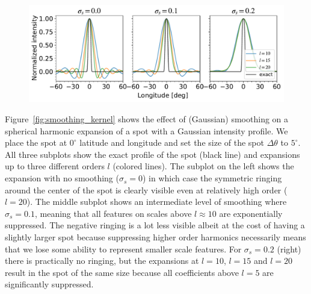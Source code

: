 \documentclass[modern]{aastex62}
\begin{document}
\begin{figure}[t!]
    \begin{centering}
    \includegraphics[width=1.\linewidth]{figures/smoothing_kernel.pdf}
    \end{centering}
\end{figure}


Figure~\ref{fig:smoothing_kernel} shows the effect of (Gaussian) smoothing on a spherical harmonic expansion of a spot with a Gaussian intensity profile.
We place the spot at $0^\circ$ latitude and longitude and set the size of the spot $\Delta\theta$ to $5^\circ$.
All three subplots show the exact profile of the spot (black line) and expansions up to three different orders $l$ (colored lines).
The subplot on the left shows the expansion with no smoothing ($\sigma_s=0$) in which case the symmetric ringing around the center of the spot is clearly visible even at relatively high order ($l=20$).
The middle subplot shows an intermediate level of smoothing where $\sigma_s=0.1$, meaning that all features on scales above $l\approx 10$ are exponentially suppressed.
The negative ringing is a lot less visible albeit at the cost of having a slightly larger spot because suppressing higher order harmonics necessarily means that we lose some ability to represent smaller scale features.
For $\sigma_s=0.2$ (right) there is practically no ringing, but the expansions at $l=10$, $l=15$ and $l=20$ result in the spot of the same size because all coefficients above $l=5$ are significantly suppressed.
\end{document}
